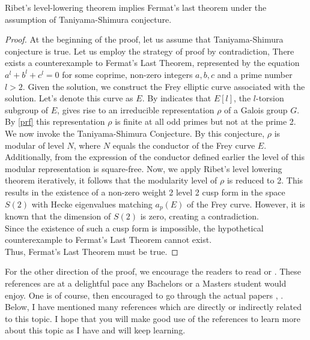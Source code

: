 \begin{corollary}
    Ribet's level-lowering theorem implies Fermat's last theorem under the assumption of Taniyama-Shimura conjecture.
\end{corollary}
\begin{proof}
At the beginning of the proof, let us assume that Taniyama-Shimura conjecture is true. Let us employ the strategy of proof by contradiction, 
There exists a counterexample to Fermat's Last Theorem, represented by the equation \( a^{l} + b^{l} + c^{l} = 0 \) for some coprime, non-zero integers \( a, b, c \) and a prime number \( l > 2 \). Given the solution, we construct the  Frey elliptic curve associated with the solution. Let's denote this curve as \( E \). By  indicates that \( E[l] \), the \( l \)-torsion subgroup of \( E \), gives rise to an irreducible representation \( \rho \) of a Galois group \( G \). By \ref{prf} this representation \( \rho \) is finite at all odd primes but not at the prime 2. We now invoke the Taniyama-Shimura Conjecture. By this conjecture, \( \rho \) is modular of level $N$, where $N$ equals the conductor of the Frey curve $E$. Additionally, from the expression of the  conductor defined earlier the level of this modular representation is square-free. Now, we apply Ribet's level lowering theorem iteratively, it follows that the modularity level of \( \rho \) is reduced to 2. This results in the existence of a non-zero weight 2 level 2 cusp form in the space \( S(2) \) with Hecke eigenvalues matching \( a_{p}(E) \) of the Frey curve. However, it is known that the dimension of \( S(2) \) is zero, creating a contradiction.\\
Since the existence of such a cusp form is impossible, the hypothetical counterexample to Fermat's Last Theorem cannot exist. \\

Thus, Fermat's Last Theorem must be true.

\end{proof}

For the other direction of the proof, we encourage the readers to read \cite{darmon1995fermat} or \cite{bostonFermat}. These references are at a delightful pace any Bachelors or a Masters student would enjoy. One is of course, then encouraged to go through the actual papers \cite{taylorwiles1995b}, \cite{wiles1995}. Below, I have mentioned many references which are directly or indirectly related to this topic. I hope that you will make good use of the references to learn more about this topic as I have and will keep learning. 


    


